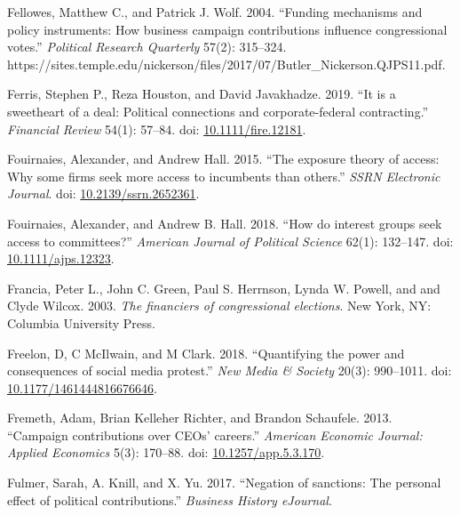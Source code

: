 \documentclass[12pt,]{article}
\newlength{\cslhangindent}
\newenvironment{CSLReferences}%
    {\setlength{\parindent}{0pt}%
    \everypar{\setlength{\hangindent}{\cslhangindent}}\ignorespaces}%
    {\par}
\begin{document}
\begin{CSLReferences}{1}{0}
\leavevmode{}%
Fellowes, Matthew C., and Patrick J. Wolf. 2004. {``Funding mechanisms
and policy instruments: How business campaign contributions influence
congressional votes.''} \emph{Political Research Quarterly} 57(2):
315--324.
https://sites.temple.edu/nickerson/files/2017/07/Butler\_Nickerson.QJPS11.pdf.

\leavevmode{}%
Ferris, Stephen P., Reza Houston, and David Javakhadze. 2019. {``It is a
sweetheart of a deal: Political connections and corporate-federal
contracting.''} \emph{Financial Review} 54(1): 57--84. doi:
\href{https://doi.org/10.1111/fire.12181}{10.1111/fire.12181}.

\leavevmode{}%
Fouirnaies, Alexander, and Andrew Hall. 2015. {``The exposure theory of
access: Why some firms seek more access to incumbents than others.''}
\emph{SSRN Electronic Journal}. doi:
\href{https://doi.org/10.2139/ssrn.2652361}{10.2139/ssrn.2652361}.

\leavevmode{}%
Fouirnaies, Alexander, and Andrew B. Hall. 2018. {``How do interest
groups seek access to committees?''} \emph{American Journal of Political
Science} 62(1): 132--147. doi:
\href{https://doi.org/10.1111/ajps.12323}{10.1111/ajps.12323}.

\leavevmode{}%
Francia, Peter L., John C. Green, Paul S. Herrnson, Lynda W. Powell, and
and Clyde Wilcox. 2003. \emph{The financiers of congressional
elections}. New York, NY: Columbia University Press.

\leavevmode{}%
Freelon, D, C McIlwain, and M Clark. 2018. {``Quantifying the power and
consequences of social media protest.''} \emph{New Media \& Society}
20(3): 990--1011. doi:
\href{https://doi.org/10.1177/1461444816676646}{10.1177/1461444816676646}.

\leavevmode{}%
Fremeth, Adam, Brian Kelleher Richter, and Brandon Schaufele. 2013.
{``Campaign contributions over CEOs' careers.''} \emph{American Economic
Journal: Applied Economics} 5(3): 170--88. doi:
\href{https://doi.org/10.1257/app.5.3.170}{10.1257/app.5.3.170}.

\leavevmode{}%
Fulmer, Sarah, A. Knill, and X. Yu. 2017. {``Negation of sanctions: The
personal effect of political contributions.''} \emph{Business History
eJournal}.


\end{CSLReferences}
\end{document}
